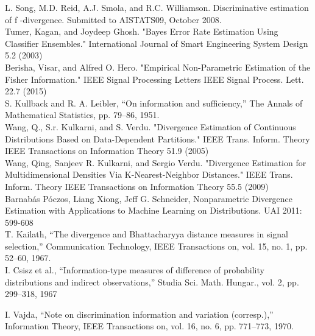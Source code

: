 \documentclass{article}
\begin{document}
	\noindent [23] L. Song, M.D. Reid, A.J. Smola, and R.C. Williamson. Discriminative estimation of f -divergence. 
	\indent Submitted to AISTATS09, October 2008.
	\\ [0.5ex]
	
	\noindent [24] Tumer, Kagan, and Joydeep Ghosh. "Bayes Error Rate Estimation Using Classifier Ensembles." 
	\indent International Journal of Smart Engineering System Design 5.2 (2003)
	\\ [0.5ex]
	
	\noindent [25] Berisha, Visar, and Alfred O. Hero. "Empirical Non-Parametric Estimation of the Fisher 
	\indent Information." IEEE Signal Processing Letters IEEE Signal Process. Lett. 22.7 (2015)
	\\ [0.5ex]
	
	\noindent [26] S. Kullback and R. A. Leibler, “On information and sufficiency,” The	Annals of Mathematical 
	\indent Statistics, pp. 79–86, 1951.
	\\ [0.5ex]
	
	\noindent [27] Wang, Q., S.r. Kulkarni, and S. Verdu. "Divergence Estimation of Continuous Distributions 
	\indent Based on Data-Dependent Partitions." IEEE Trans. Inform. Theory IEEE Transactions on 
	\indent Information Theory 51.9 (2005)
	\\ [0.5ex]
	
	\noindent [28] Wang, Qing, Sanjeev R. Kulkarni, and Sergio Verdu. "Divergence Estimation for Multidimensional 
	\indent Densities Via K-Nearest-Neighbor Distances." IEEE Trans. Inform. Theory IEEE Transactions 
	\indent on Information Theory 55.5 (2009)
	\\ [0.5ex]

	\noindent [29] Barnabás Póczos, Liang Xiong, Jeff G. Schneider, Nonparametric Divergence Estimation with 
	\indent Applications to Machine Learning on Distributions. UAI 2011: 599-608
	\\ [0.5ex]
	
	\noindent [30] T. Kailath, “The divergence and Bhattacharyya distance measures in signal selection,” Communication 
	\indent Technology, IEEE Transactions on,	vol. 15, no. 1, pp. 52–60, 1967.
	\\ [0.5ex]
	
	\noindent [31] I. Csisz et al., “Information-type measures of difference of probability	distributions and indirect 
	\indent observations,” Studia Sci. Math. Hungar.,
	vol. 2, pp. 299–318, 1967
	
	\noindent [32] I. Vajda, “Note on discrimination information and variation (corresp.),”	Information Theory, IEEE 
	\indent Transactions on, vol. 16, no. 6, pp. 771–773, 1970.
\end{document}
